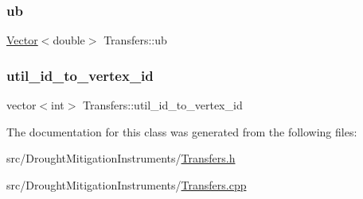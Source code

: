 \subsubsection{\texorpdfstring{ub}{ub}}
{\footnotesize\ttfamily \mbox{\hyperlink{classVector}{Vector}}$<$double$>$ Transfers\+::ub\hspace{0.3cm}{\ttfamily [private]}}

\mbox{\label{classTransfers_a420b61c6ff119fef48a39a39ae4e0958_a420b61c6ff119fef48a39a39ae4e0958}} 
\subsubsection{\texorpdfstring{util\+\_\+id\+\_\+to\+\_\+vertex\+\_\+id}{util\_id\_to\_vertex\_id}}
{\footnotesize\ttfamily vector$<$int$>$ Transfers\+::util\+\_\+id\+\_\+to\+\_\+vertex\+\_\+id\hspace{0.3cm}{\ttfamily [private]}}



The documentation for this class was generated from the following files\+:\begin{DoxyCompactItemize}
\item 
src/\+Drought\+Mitigation\+Instruments/\mbox{\hyperlink{Transfers_8h}{Transfers.\+h}}\item 
src/\+Drought\+Mitigation\+Instruments/\mbox{\hyperlink{Transfers_8cpp}{Transfers.\+cpp}}\end{DoxyCompactItemize}
